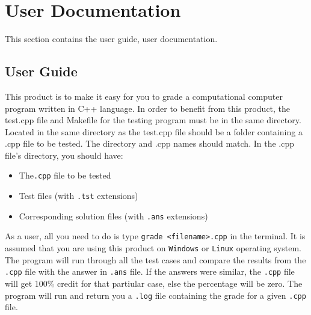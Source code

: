 
\chapter{User Documentation}

This section contains the user guide, user documentation.


\section{User Guide}

This product is to make it easy for you to grade a computational computer program written in C++ language. In order to benefit from this product, the test.cpp file and Makefile for the testing program must be in the same directory. Located in the same directory as the test.cpp file should be a folder containing a .cpp file to be tested. The directory and .cpp names should match. In the .cpp file’s directory, you should have:

	\begin{itemize} 
  		\item The{\tt .cpp} file to be tested
  		\item Test files (with {\tt .tst} extensions) 
  		\item Corresponding solution files (with {\tt .ans} extensions)
	\end{itemize} 

As a user, all you need to do is type {\tt grade <filename>.cpp} in the terminal. It is assumed that you are using this product on  {\tt Windows} or  {\tt Linux} operating system. The program will run through all the test cases and compare the results from the  {\tt .cpp} file with the answer in  {\tt .ans} file. If the answers were similar, the {\tt .cpp} file will get 100\% credit for that partiular case, else the percentage will be zero. The program will run and return you a {\tt .log} file containing the grade for a given {\tt .cpp} file.
   


